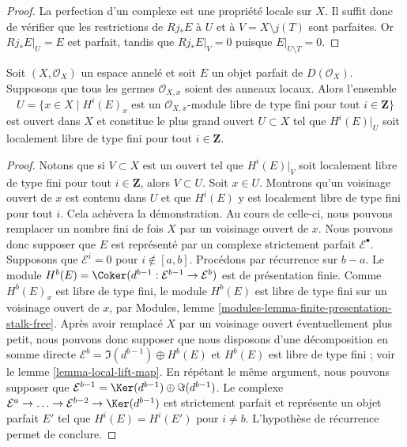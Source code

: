 \begin{proof}
La perfection d'un complexe est une propriété locale sur $X$. Il suffit donc de vérifier que les restrictions de $Rj_*E$ à $U$ et à $V = X \setminus j(T)$ sont parfaites. Or $Rj_*E|_U = E$ est parfait, tandis que $Rj_*E|_V = 0$ puisque $E|_{U \setminus T} = 0$.
\end{proof}

\begin{lemma}

\label{lemma-perfect-max-open-coh-loc-free}
Soit $(X, \mathcal{O}_X)$ un espace annelé et soit $E$ un objet parfait de $D(\mathcal{O}_X)$. Supposons que tous les germes $\mathcal{O}_{X, x}$ soient des anneaux locaux. Alors l'ensemble $$
U =
\{x \in X \mid
H^i(E)_x\text{ est un }
\mathcal{O}_{X, x}\text{-module libre de type fini pour tout }i\in \mathbf{Z}\}
$$ est ouvert dans $X$ et constitue le plus grand ouvert $U \subset X$ tel que $H^i(E)|_U$ soit localement libre de type fini pour tout $i \in \mathbf{Z}$.
\end{lemma}

\begin{proof}

Notons que si $V \subset X$ est un ouvert tel que $H^i(E)|_V$
soit localement libre de type fini pour tout $i \in \mathbf{Z}$, alors $V \subset U$. Soit $x \in U$. Montrons qu'un voisinage ouvert de $x$
est contenu dans $U$ et que $H^i(E)$ y est localement libre de type fini pour tout $i$. Cela achèvera la démonstration. Au cours de celle-ci, nous pouvons remplacer un nombre fini de fois
$X$ par un voisinage ouvert de $x$. Nous pouvons donc supposer que $E$ est représenté par un complexe strictement parfait $\mathcal{E}^\bullet$. Supposons que
$\mathcal{E}^i = 0$ pour $i \not \in [a, b]$. Procédons par récurrence sur $b - a$. Le module
$H^b(E) = \Coker(d^{b - 1} : \mathcal{E}^{b - 1} \to \mathcal{E}^b)$
est de présentation finie. Comme $H^b(E)_x$ est libre de type fini, le module $H^b(E)$ est libre de type fini sur un voisinage ouvert de $x$, par Modules, lemme \ref{modules-lemma-finite-presentation-stalk-free}. Après avoir remplacé $X$ par un voisinage ouvert éventuellement plus petit, nous pouvons donc supposer que nous disposons d'une décomposition en somme directe
$\mathcal{E}^b = \Im(d^{b - 1}) \oplus H^b(E)$ et
$H^b(E)$ est libre de type fini ; voir le lemme \ref{lemma-local-lift-map}. En répétant le même argument, nous pouvons supposer que $\mathcal{E}^{b - 1} = \Ker(d^{b - 1}) \oplus \Im(d^{b - 1})$. Le complexe
$\mathcal{E}^a \to \ldots \to \mathcal{E}^{b - 2} \to \Ker(d^{b - 1})$
est strictement parfait et représente un objet parfait $E'$ tel que $H^i(E) = H^i(E')$ pour $i \not = b$. L'hypothèse de récurrence permet de conclure.

\end{proof}





